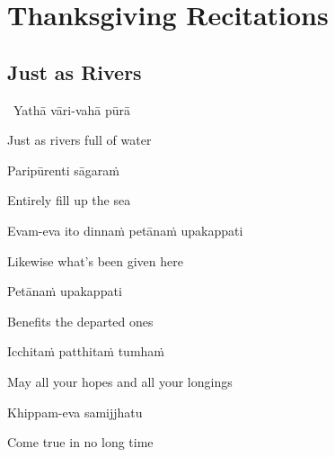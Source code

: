 
\chapter{Thanksgiving Recitations}

\clearpage

\section{Just as Rivers}
\label{just-as-rivers}

\anglebracketleft\ \hspace{-0.5mm}Yathā vāri-vahā pūrā \hspace{-0.5mm}\anglebracketright\

\begin{english}
  Just as rivers full of water
\end{english}

Paripūrenti sāgaraṁ

\begin{english}
  Entirely fill up the sea
\end{english}

Evam-eva ito dinnaṁ petānaṁ upakappati

\begin{english}
  Likewise what's been given here\hyperlink{endnote114-appendix}{\hypertarget{endnote114-body}{}}
\end{english}

Petānaṁ upakappati

\begin{english}
  Benefits the departed ones\hyperlink{endnote115-appendix}{\hypertarget{endnote115-body}{}}
\end{english}


Icchitaṁ patthitaṁ tumhaṁ

\begin{english}
  May all your hopes and all your longings
\end{english}

Khippam-eva samijjhatu

\begin{english}
  Come true in no long time
\end{english}

